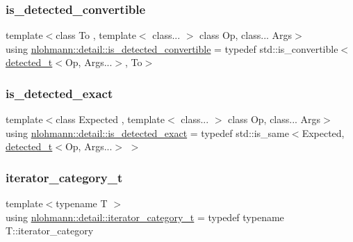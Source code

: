 \mbox{\label{namespacenlohmann_1_1detail_a5262e531c46e357b33007060f294673b}} 
\subsubsection{\texorpdfstring{is\+\_\+detected\+\_\+convertible}{is\_detected\_convertible}}
{\footnotesize\ttfamily template$<$class To , template$<$ class... $>$ class Op, class... Args$>$ \\
using \hyperlink{namespacenlohmann_1_1detail_a5262e531c46e357b33007060f294673b}{nlohmann\+::detail\+::is\+\_\+detected\+\_\+convertible} = typedef std\+::is\+\_\+convertible$<$\hyperlink{namespacenlohmann_1_1detail_a37e97a32d0b94ce5f745427e4e40204d}{detected\+\_\+t}$<$Op, Args...$>$, To$>$}

\mbox{\label{namespacenlohmann_1_1detail_a7542b4dbac07817fd4849ecfa4619def}} 
\subsubsection{\texorpdfstring{is\+\_\+detected\+\_\+exact}{is\_detected\_exact}}
{\footnotesize\ttfamily template$<$class Expected , template$<$ class... $>$ class Op, class... Args$>$ \\
using \hyperlink{namespacenlohmann_1_1detail_a7542b4dbac07817fd4849ecfa4619def}{nlohmann\+::detail\+::is\+\_\+detected\+\_\+exact} = typedef std\+::is\+\_\+same$<$Expected, \hyperlink{namespacenlohmann_1_1detail_a37e97a32d0b94ce5f745427e4e40204d}{detected\+\_\+t}$<$Op, Args...$>$ $>$}

\mbox{\label{namespacenlohmann_1_1detail_ad22d2aa3aab018050ae519f6754366e1}} 
\subsubsection{\texorpdfstring{iterator\+\_\+category\+\_\+t}{iterator\_category\_t}}
{\footnotesize\ttfamily template$<$typename T $>$ \\
using \hyperlink{namespacenlohmann_1_1detail_ad22d2aa3aab018050ae519f6754366e1}{nlohmann\+::detail\+::iterator\+\_\+category\+\_\+t} = typedef typename T\+::iterator\+\_\+category}

